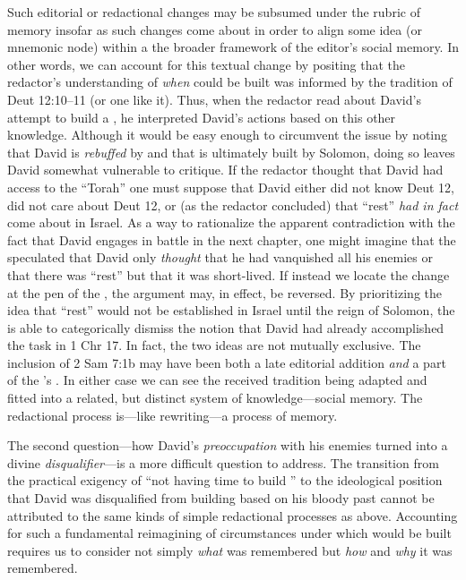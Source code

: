 Such editorial or redactional changes may be subsumed under the rubric of memory insofar as such changes come about in order to align some idea (or mnemonic node) within a the broader framework of the editor's social memory. In other words, we can account for this textual change by positing that the redactor's understanding of \emph{when} \thetemple could be built was informed by the tradition of Deut 12:10--11 (or one like it). Thus, when the redactor read about David's attempt to build a \temple, he interpreted David's actions based on this other knowledge. Although it would be easy enough to circumvent the issue by noting that David is \emph{rebuffed} by \yahweh and that \thetemple is ultimately built by Solomon, doing so leaves David somewhat vulnerable to critique. If the redactor thought that David had access to the ``Torah'' one must suppose that David either did not know Deut 12, did not care about Deut 12, or (as the redactor concluded) that ``rest'' \emph{had in fact} come about in Israel. As a way to rationalize the apparent contradiction with the fact that David engages in battle in the next chapter, one might imagine that the \chronicler speculated that David only \emph{thought} that he had vanquished all his enemies or that there was ``rest'' but that it was short-lived. If instead we locate the change at the pen of the \chronicler, the argument may, in effect, be reversed. By prioritizing the idea that ``rest'' would not be established in Israel until the reign of Solomon, the \chronicler is able to categorically dismiss the notion that David had already accomplished the task in 1 Chr 17. In fact, the two ideas are not mutually exclusive. The inclusion of 2 Sam 7:1b may have been both a late editorial addition \emph{and} a part of the \chronicler's \vorlage. In either case we can see the received tradition being adapted and fitted into a related, but distinct system of knowledge---social memory. The redactional process is---like rewriting---a process of memory.

The second question---how David's \emph{preoccupation} with his enemies turned into a divine \emph{disqualifier}---is a more difficult question to address. The transition from the practical exigency of ``not having time to build \thetemple'' to the ideological position that David was disqualified from building \thetemple based on his bloody past cannot be attributed to the same kinds of simple redactional processes as above. Accounting for such a fundamental reimagining of circumstances under which \thetemple would be built requires us to consider not simply \emph{what} was remembered but \emph{how} and \emph{why} it was remembered. 

